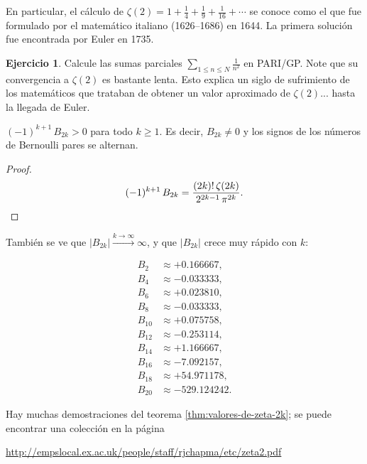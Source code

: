 \documentclass{article}
\numberwithin{equation}{section}
\theoremstyle{definition}
\newtheorem{ejercicio}{Ejercicio}
\begin{document}
En particular, el cálculo de
$\zeta (2) = 1 + \frac{1}{4} + \frac{1}{9} + \frac{1}{16} + \cdots$ se conoce
como el  que fue formulado por el matemático italiano
 (1626--1686) en 1644. La primera solución fue
encontrada por Euler en 1735.

\begin{ejercicio}
  Calcule las sumas parciales $\sum_{1 \le n \le N} \frac{1}{n^2}$ en
  PARI/GP. Note que su convergencia a $\zeta (2)$ es bastante lenta. Esto
  explica un siglo de sufrimiento de los matemáticos que trataban de obtener un
  valor aproximado de $\zeta (2)$... hasta la llegada de Euler.
\end{ejercicio}

\begin{corolario}
  $(-1)^{k+1}\,B_{2k} > 0$ para todo $k \ge 1$. Es decir, $B_{2k} \ne 0$ y los
  signos de los números de Bernoulli pares se alternan.

\begin{proof}
  \[ (-1)^{k+1}\, B_{2k} = \frac{(2k)! \, \zeta (2k)}{2^{2k-1}\,\pi^{2k}}. \qedhere \]
\end{proof}
\end{corolario}

También se ve que $|B_{2k}| \xrightarrow{k \to \infty} \infty$, y que $|B_{2k}|$
crece muy rápido con $k$:

\begin{align*}
  B_2 & \approx +0.166667,\\
  B_4 & \approx -0.033333,\\
  B_6 & \approx +0.023810,\\
  B_8 & \approx -0.033333,\\
  B_{10} & \approx +0.075758,\\
  B_{12} & \approx -0.253114,\\
  B_{14} & \approx +1.166667,\\
  B_{16} & \approx -7.092157,\\
  B_{18} & \approx +54.971178,\\
  B_{20} & \approx -529.124242.
\end{align*}

Hay muchas demostraciones del teorema \ref{thm:valores-de-zeta-2k}; se puede
encontrar una colección en la página

\begin{center}
  \noindent\url{http://empslocal.ex.ac.uk/people/staff/rjchapma/etc/zeta2.pdf}
\end{center}
\end{document}
